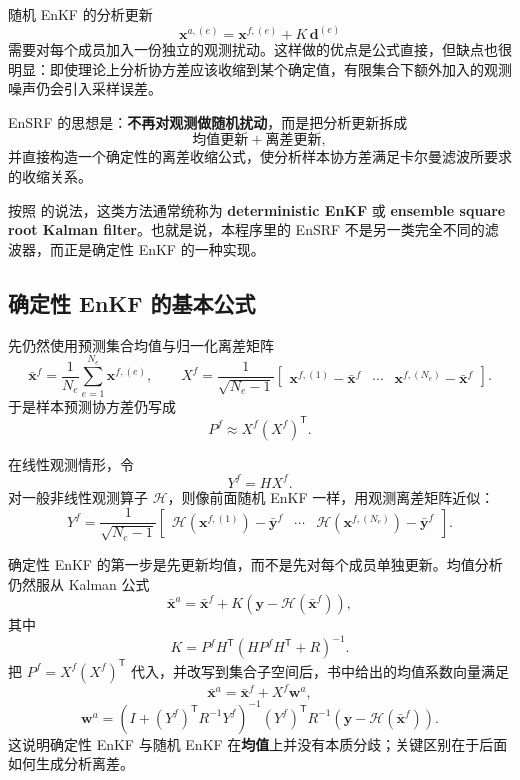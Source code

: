 \documentclass[12pt,a4paper]{article}
\begin{document}
随机 EnKF 的分析更新
\[
\mathbf{x}^{a,(e)}
= \mathbf{x}^{f,(e)} + K\,\mathbf{d}^{(e)}
\]
需要对每个成员加入一份独立的观测扰动。这样做的优点是公式直接，但缺点也很明显：即使理论上分析协方差应该收缩到某个确定值，有限集合下额外加入的观测噪声仍会引入采样误差。

EnSRF 的思想是：\textbf{不再对观测做随机扰动}，而是把分析更新拆成
\[
\text{均值更新} + \text{离差更新},
\]
并直接构造一个确定性的离差收缩公式，使分析样本协方差满足卡尔曼滤波所要求的收缩关系。

按照 \cite[Sec.~6.4]{asch2016data} 的说法，这类方法通常统称为
\textbf{deterministic EnKF} 或 \textbf{ensemble square root Kalman filter}。也就是说，本程序里的 EnSRF 不是另一类完全不同的滤波器，而正是确定性 EnKF 的一种实现。

\subsection{确定性 EnKF 的基本公式}

先仍然使用预测集合均值与归一化离差矩阵
\[
\bar{\mathbf{x}}^f=\frac{1}{N_e}\sum_{e=1}^{N_e}\mathbf{x}^{f,(e)},
\qquad
X^f
= \frac{1}{\sqrt{N_e-1}}
\begin{bmatrix}
\mathbf{x}^{f,(1)}-\bar{\mathbf{x}}^f &
\cdots &
\mathbf{x}^{f,(N_e)}-\bar{\mathbf{x}}^f
\end{bmatrix}.
\]
于是样本预测协方差仍写成
\[
P^f \approx X^f (X^f)^{\mathsf T}.
\]

在线性观测情形，令
\[
Y^f = H X^f.
\]
对一般非线性观测算子 $\mathcal{H}$，则像前面随机 EnKF 一样，用观测离差矩阵近似：
\[
Y^f
= \frac{1}{\sqrt{N_e-1}}
\begin{bmatrix}
\mathcal{H}(\mathbf{x}^{f,(1)})-\bar{\mathbf{y}}^f &
\cdots &
\mathcal{H}(\mathbf{x}^{f,(N_e)})-\bar{\mathbf{y}}^f
\end{bmatrix}.
\]

确定性 EnKF 的第一步是先更新均值，而不是先对每个成员单独更新。均值分析仍然服从 Kalman 公式
\[
\bar{\mathbf{x}}^a
= \bar{\mathbf{x}}^f + K\left(\mathbf{y}-\mathcal{H}(\bar{\mathbf{x}}^f)\right),
\]
其中
\[
K = P^f H^{\mathsf T}(H P^f H^{\mathsf T}+R)^{-1}.
\]
把 $P^f=X^f(X^f)^{\mathsf T}$ 代入，并改写到集合子空间后，书中给出的均值系数向量满足
\[
\bar{\mathbf{x}}^a = \bar{\mathbf{x}}^f + X^f \mathbf{w}^a,
\]
\[
\mathbf{w}^a
= \left(I + (Y^f)^{\mathsf T} R^{-1} Y^f\right)^{-1}
(Y^f)^{\mathsf T} R^{-1}
\left(\mathbf{y}-\mathcal{H}(\bar{\mathbf{x}}^f)\right).
\]
这说明确定性 EnKF 与随机 EnKF 在\textbf{均值}上并没有本质分歧；关键区别在于后面如何生成分析离差。
\end{document}
